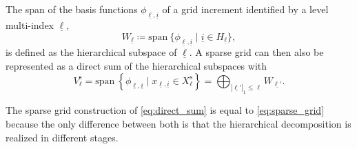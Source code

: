 \documentclass[
  a4paper,  %
  twoside,  %
  bibliography=totoc,
  headsepline,
  cleardoublepage=empty,
  parskip=half,
  draft=false
]{scrbook}
\begin{document}
\begin{definition}
The span of the basis functions $\phi_{\underline{\ell},\underline{i}}$ of a grid increment identified by a level multi-index $\underline{\ell}$,
\begin{equation}
W_{\underline{\ell}} \coloneqq \mathrm{span}~ \{\phi_{\underline{\ell},\underline{i}} \mid \underline{i} \in H_{\underline{\ell}}\},
\end{equation}
is defined as the hierarchical subspace of $\underline{\ell}$.
A sparse grid can then also be represented as a direct sum of the hierarchical subspaces with
\begin{equation}
V^{\mathrm{s}}_{\ell} = \mathrm{span}~ \left\{\phi_{\underline{\ell},\underline{i}} \mid x_{\underline{\ell},\underline{i}} \in X^{\mathrm{s}}_{\ell}\right\}=\bigoplus_{|\underline{\ell'}|_1 \leq \ell} W_{\underline{\ell'}}.
\label{eq:direct_sum}
\end{equation}
\end{definition}
%
The sparse grid construction of \cref{eq:direct_sum} is equal to \cref{eq:sparse_grid} because the only difference between both is that the hierarchical decomposition is realized in different stages.
\end{document}
